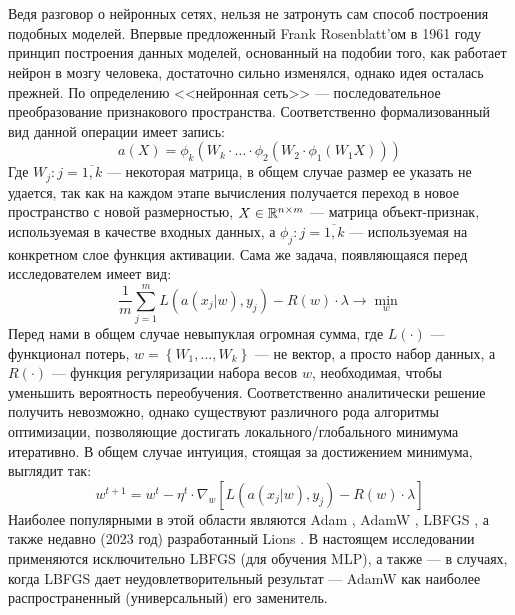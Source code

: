 \\\\
\indent Ведя разговор о нейронных сетях, нельзя не затронуть сам способ построения подобных моделей. Впервые предложенный Frank Rosenblatt'ом \cite{rosenblatt1961principles}  в 1961 году принцип построения данных моделей, основанный на подобии того, как работает нейрон в мозгу человека, достаточно сильно изменялся, однако идея осталась прежней. По определению <<нейронная сеть>> --- последовательное преобразование признакового пространства. Соответственно формализованный вид данной операции имеет запись:
\begin{equation}
	a(X) = \phi_k(W_k \cdot \ldots \cdot \phi_2(W_2 \cdot \phi_1(W_1 X)))
\end{equation}
Где $W_j: j = \overline{1, k}$ --- некоторая матрица, в общем случае размер ее указать не удается, так как на каждом этапе вычисления получается переход в новое пространство с новой размерностью, $X \in \mathbb{R}^{n \times m}$ --- матрица объект-признак, используемая в качестве входных данных, а $\phi_j : j = \overline{1, k}$ --- используемая на конкретном слое функция активации. Сама же задача, появляющаяся перед исследователем имеет вид:
\begin{equation}
	\frac{1}{m} \sum_{j = 1}^m L(a(x_j | w), y_j) - R(w) \cdot \lambda \to \min_{w}
\end{equation}
Перед нами в общем случае невыпуклая огромная сумма, где $L(\cdot)$ --- функционал потерь, $w = \left\{W_1, \ldots, W_k\right\}$ --- не вектор, а просто набор данных, а $R(\cdot)$ --- функция регуляризации набора весов $w$, необходимая, чтобы уменьшить вероятность переобучения. Соответственно аналитически решение получить невозможно, однако существуют различного рода алгоритмы оптимизации, позволяющие достигать локального/глобального минимума итеративно. В общем случае интуиция, стоящая за достижением минимума, выглядит так:
\begin{equation}
	w^{t + 1} = w^t - \eta^t \cdot \nabla_w \left[L(a(x_j | w), y_j) - R(w) \cdot \lambda\right]
\end{equation}
Наиболее популярными в этой области являются Adam \cite{kingma2014adam}, AdamW \cite{bock2018improvement}, LBFGS \cite{liu1989limited}, а также недавно (2023 год) разработанный Lions \cite{chen2023symbolic}. В настоящем исследовании применяются исключительно LBFGS (для обучения MLP), а также --- в случаях, когда LBFGS дает неудовлетворительный результат --- AdamW как наиболее распространенный (универсальный) его заменитель.

